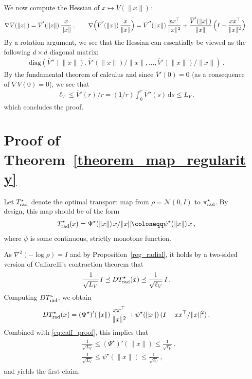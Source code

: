 \documentclass[twoside]{article}
\newcommand{\cN}{\mathcal{N}}
\newcommand{\1}{\mathds{1}}
\newcommand*{\defeq}{\coloneqq}
\newcommand*{\rd}{\mathrm{d}}
\newcommand*{\dd}{\, \rd}
\newcommand{\pirad}{\pi_{\rm rad}}
\theoremstyle{plain}
\theoremstyle{definition}
\theoremstyle{remark}
\begin{document}
We now compute the Hessian of $x \mapsto \overline{V}(\|x\|)$:
\begin{align*}
    \nabla \overline{V}(\|x\|) = \overline{V}'(\|x\|)\, \frac{x}{\|x\|}\,, \qquad \nabla\Bigr(\overline{V}'(\|x\|)\, \frac{x}{\|x\|}\Bigr) = \overline{V}''(\|x\|)\, \frac{xx^\top}{\|x\|^2} + \frac{\overline{V}'(\|x\|)}{\|x\|}\,\Bigl( I - \frac{xx^\top}{\|x\|^2}\Bigr)\,.
\end{align*}
By a rotation argument, we see that the Hessian can essentially be viewed as the following $d\times d$ diagonal matrix:
\begin{align*}
    \text{diag}(\overline{V}''(\|x\|), \overline{V}'(\|x\|)/\|x\|, \ldots,\overline{V}'(\|x\|)/\|x\|)\,.
\end{align*}
By the fundamental theorem of calculus and since $\overline V'(0) = 0$ (as a consequence of $\nabla V(0) = 0$), we see that 
\begin{align*}
    \ell_V \leq \overline{V}'(r)/r = (1/r) \int_0^r \overline{V}''(s)\dd s \leq L_V\,,
\end{align*}
which concludes the proof. 

\section{Proof of Theorem~\ref{theorem_map_regularity}}\label{app:reg_ot_map}

Let $T^\star_{\rm rad}$ denote the optimal transport map from $\rho = \cN(0,I)$ to $\pirad^\star$. By design, this map should be of the form
\begin{align*}
    T_{\rm rad}^\star(x) = \Psi^\star(\|x\|)\,x/\|x\| \defeq \psi^\star(\|x\|)\,x\,,
\end{align*}
where $\psi$ is some continuous, strictly monotone function.

As $\nabla^2(-\log\rho) = I$ and by Proposition~\ref{reg_radial}, it holds by a two-sided version of Caffarelli's contraction theorem \citep[see, e.g.,][]{chewi2023entropic} that
\begin{align}\label{eq:caff_proof}
    \frac{1}{\sqrt{L_V}\,} I \preceq D T_{\rm rad}^\star(x) \preceq \frac{1}{\sqrt{\ell_V}}\,I\,.
\end{align}
Computing $DT_{\rm rad}^\star$, we obtain
\begin{align*}
    DT_{\rm rad}^\star(x) = (\Psi^\star)'(\|x\|)\, \frac{xx^\top}{\|x\|^2} + \psi^\star(\|x\|)\,(I - xx^\top/\|x\|^2)\,.
\end{align*}
Combined with \eqref{eq:caff_proof}, this implies that
\begin{align}\label{eq:psi_inequalities}
\begin{split}
    &\frac{1}{\sqrt{L_V}} \leq (\Psi^\star)'(\|x\|) \leq \frac{1}{\sqrt{\ell_V}}\,, \\
    &\frac{1}{\sqrt{L_V}} \leq \psi^\star(\|x\|) \leq \frac{1}{\sqrt{\ell_V}}\,,
\end{split}
\end{align}
and yields the first claim.
\end{document}
